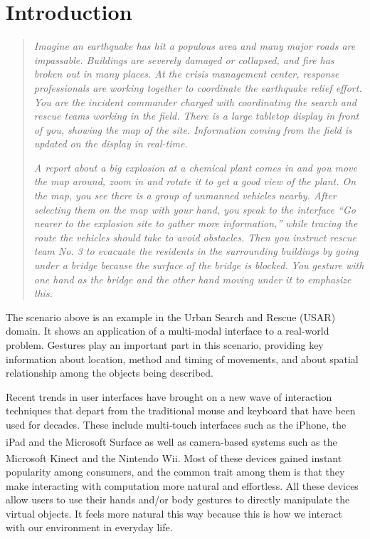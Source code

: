 \section{Introduction}
\begin{quotation}
\textit{Imagine an earthquake has hit a populous area and many major roads are
impassable. Buildings are severely damaged or collapsed, and fire has broken out
in many places. At the crisis management center, response professionals are
working together to coordinate the earthquake relief effort. You are the
incident commander charged with coordinating the search
and rescue teams working in the field. There is a large tabletop display in
front of you, showing the map of the site. Information coming from the field is
updated on the display in real-time.}

\textit{A report about a big explosion at a chemical plant comes in and you move
the map around, zoom in and rotate it to get a good view of the plant. On the
map, you see there is a group of unmanned vehicles nearby. After selecting them
on the map with your hand, you speak to the interface ``Go nearer to the
explosion site to gather more information,'' while tracing the route the
vehicles should take to avoid obstacles. Then you instruct rescue team No. 3 to evacuate the residents
in the surrounding buildings by going under a bridge because the surface of the
bridge is blocked. You gesture with one hand as the bridge and the other
hand moving under it to emphasize this.}
\end{quotation}

The scenario above is an example in the Urban Search and Rescue (USAR) domain.
It shows an application of a multi-modal interface to a real-world problem. Gestures play an important part in this scenario,
providing key information about location, method and timing of movements,
and about spatial relationship among the objects being described.

Recent trends in user interfaces have brought on a new wave of interaction
techniques that depart from the traditional mouse and keyboard that have been 
used for decades. These include multi-touch interfaces such as the 
iPhone, the iPad and the Microsoft 
Surface\textsuperscript{\textregistered} as well as camera-based systems such as
the Microsoft Kinect and the Nintendo\textsuperscript{\textregistered} Wii. Most
of these devices gained instant popularity among consumers, and the common trait
among them is that they make interacting with computation more natural and 
effortless. All these devices allow users to use their hands and/or body 
gestures to directly manipulate the virtual objects. It feels more natural this 
way because this is how we interact with our environment in everyday life.
 
